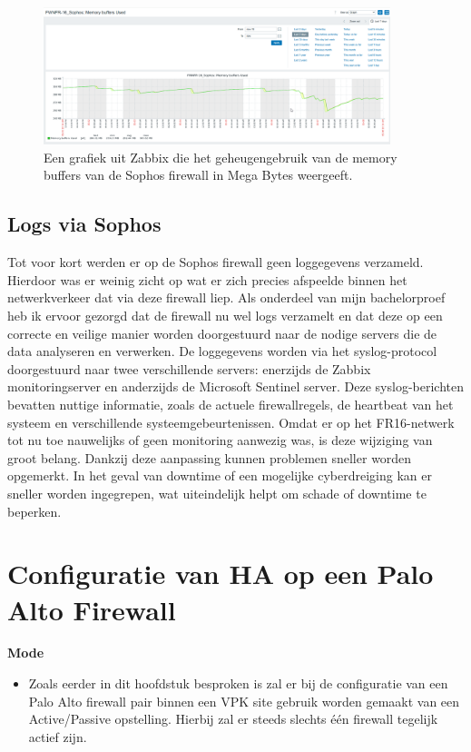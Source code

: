 \begin{figure}[H]
    \centering
    \includegraphics[width=0.9\textwidth]{fotos/SophosZabbix.png}
    \caption[Sophos Memory Buffer in Zabbix]{\label{fig:grail}Een grafiek uit Zabbix die het geheugengebruik van de memory buffers van de Sophos firewall in Mega Bytes weergeeft.}
\end{figure} 


\subsection{Logs via Sophos}
Tot voor kort werden er op de Sophos firewall geen loggegevens verzameld. Hierdoor was er weinig zicht op wat er zich precies afspeelde binnen het netwerkverkeer dat via deze firewall liep. Als onderdeel van mijn bachelorproef heb ik ervoor gezorgd dat de firewall nu wel logs verzamelt en dat deze op een correcte en veilige manier worden doorgestuurd naar de nodige servers die de data analyseren en verwerken.
De loggegevens worden via het syslog-protocol doorgestuurd naar twee verschillende servers: enerzijds de Zabbix monitoringserver en anderzijds de Microsoft Sentinel server. Deze syslog-berichten bevatten nuttige informatie, zoals de actuele firewallregels, de heartbeat van het systeem en verschillende systeemgebeurtenissen.
Omdat er op het FR16-netwerk tot nu toe nauwelijks of geen monitoring aanwezig was, is deze wijziging van groot belang. Dankzij deze aanpassing kunnen problemen sneller worden opgemerkt. In het geval van downtime of een mogelijke cyberdreiging kan er sneller worden ingegrepen, wat uiteindelijk helpt om schade of downtime te beperken.



\section{Configuratie van HA op een Palo Alto Firewall}

\textbf{Mode}
    \begin{itemize}[label=\textbullet]
        \item Zoals eerder in dit hoofdstuk besproken is zal er bij de configuratie van een Palo Alto firewall pair binnen een VPK site gebruik worden gemaakt van een Active/Passive opstelling. Hierbij zal er steeds slechts één firewall tegelijk actief zijn.
    \end{itemize}



